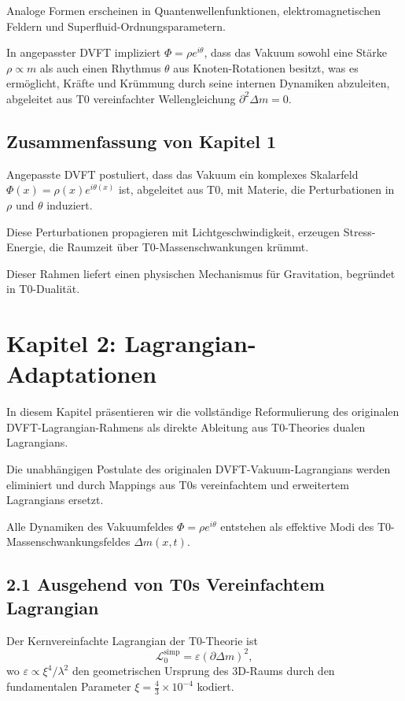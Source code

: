	Analoge Formen erscheinen in Quantenwellenfunktionen, elektromagnetischen Feldern und Superfluid-Ordnungsparametern.
	
	In angepasster DVFT impliziert $\Phi = \rho e^{i\theta}$, dass das Vakuum sowohl eine Stärke $\rho \propto m$ als auch einen Rhythmus $\theta$ aus Knoten-Rotationen besitzt, was es ermöglicht, Kräfte und Krümmung durch seine internen Dynamiken abzuleiten, abgeleitet aus T0 vereinfachter Wellengleichung $\partial^2 \Delta m = 0$.
	
	\subsection{Zusammenfassung von Kapitel 1}
	
	Angepasste DVFT postuliert, dass das Vakuum ein komplexes Skalarfeld $\Phi(x) = \rho(x) e^{i\theta(x)}$ ist, abgeleitet aus T0, mit Materie, die Perturbationen in $\rho$ und $\theta$ induziert.
	
	Diese Perturbationen propagieren mit Lichtgeschwindigkeit, erzeugen Stress-Energie, die Raumzeit über T0-Massenschwankungen krümmt.
	
	Dieser Rahmen liefert einen physischen Mechanismus für Gravitation, begründet in T0-Dualität.
	
	\section{Kapitel 2: Lagrangian-Adaptationen}
	
	In diesem Kapitel präsentieren wir die vollständige Reformulierung des originalen DVFT-Lagrangian-Rahmens als direkte Ableitung aus T0-Theories dualen Lagrangians.
	
	Die unabhängigen Postulate des originalen DVFT-Vakuum-Lagrangians werden eliminiert und durch Mappings aus T0s vereinfachtem und erweitertem Lagrangians ersetzt.
	
	Alle Dynamiken des Vakuumfeldes $\Phi = \rho e^{i\theta}$ entstehen als effektive Modi des T0-Massenschwankungsfeldes $\Delta m(x,t)$.
	
	\subsection{2.1 Ausgehend von T0s Vereinfachtem Lagrangian}
	
	Der Kernvereinfachte Lagrangian der T0-Theorie ist
	\[
	\mathcal{L}_0^{\text{simp}} = \varepsilon (\partial \Delta m)^2,
	\]
	wo $\varepsilon \propto \xi^4 / \lambda^2$ den geometrischen Ursprung des 3D-Raums durch den fundamentalen Parameter $\xi = \frac{4}{3} \times 10^{-4}$ kodiert.
	
